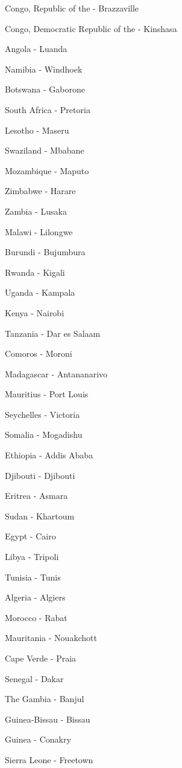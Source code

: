 \documentclass[12pt]{article}
\begin{document}
\begin{multicols}{3}
\tiny\begin{enumerate*}
\item Congo, Republic of the - Brazzaville
\item Congo, Democratic Republic of the - Kinshasa
\item Angola - Luanda
\item Namibia - Windhoek
\item Botswana - Gaborone
\item South Africa - Pretoria
\item Lesotho - Maseru
\item Swaziland - Mbabane
\item Mozambique - Maputo
\item Zimbabwe - Harare
\item Zambia - Lusaka
\item Malawi - Lilongwe
\item Burundi - Bujumbura
\item Rwanda - Kigali
\item Uganda - Kampala
\item Kenya - Nairobi
\item Tanzania - Dar es Salaam
\item Comoros - Moroni
\item Madagascar - Antananarivo
\item Mauritius - Port Louis
\item Seychelles - Victoria
\item Somalia - Mogadishu
\item Ethiopia - Addis Ababa
\item Djibouti - Djibouti
\item Eritrea - Asmara
\item Sudan - Khartoum
\item Egypt - Cairo
\item Libya - Tripoli
\item Tunisia - Tunis
\item Algeria - Algiers
\item Morocco - Rabat
\item Mauritania - Nouakchott
\item Cape Verde - Praia
\item Senegal - Dakar
\item The Gambia - Banjul
\item Guinea-Bissau - Bissau
\item Guinea - Conakry
\item Sierra Leone - Freetown

\end{enumerate*}
\end{multicols}
\end{document}
